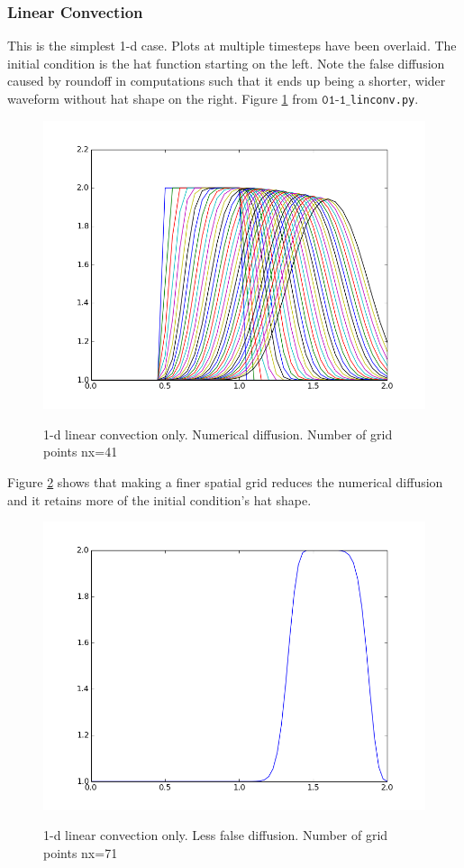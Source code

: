 \documentclass[11pt]{article}
\begin{document}
{\subsubsection{Linear Convection}\label{cfl+friends}
This is the simplest 1-d case. Plots at multiple timesteps have been overlaid.
The initial condition is the hat function starting on the left.
Note the false diffusion caused by roundoff in computations such that it ends up being a
shorter, wider waveform without hat shape on the right. Figure \ref{fig:num_diff} from
$\texttt{01-1\_}$\texttt{linconv.py}.

	\begin{figure}[H]
	\centering
	\caption{1-d linear convection only. Numerical diffusion. Number of grid points nx=41}
	\includegraphics[scale=0.8]{num_diff.png}
	\label{fig:num_diff}
	\end{figure}

Figure \ref{fig:num_diff_fine_mesh} shows that making a finer spatial grid reduces the
numerical diffusion and it retains more of the initial condition's hat shape.

	\begin{figure}[H]
	\centering
	\caption{1-d linear convection only. Less false diffusion. Number of grid points nx=71}
	\includegraphics[scale=0.8]{better_hat.png}
	\label{fig:num_diff_fine_mesh}
	\end{figure}

}
\end{document}
